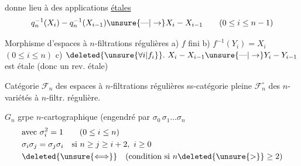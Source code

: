 donne lieu à des applications \uline{étales}
\[ q_n^{-1}(X_i)-q_n^{-1}(X_{i-1})\unsure{\text{---}|\to}X_i-X_{i-1}\qquad(0\leq i\leq n-1) \]

Morphisme d'espaces à $n$-filtrations régulières
a) $f$ fini
b) $f^{-1}(Y_i)=X_i$ \qquad $(0\leq i\leq n)$
c) $\deleted{\unsure{\forall i|f_i}}.\ X_i-X_{i-1}\unsure{\text{---}|\to}Y_i-Y_{i-1}$ est étale (donc un rev. étale)

Catégorie $\mathcal F_n$ des espaces à $n$-filtrations régulières ss-catégorie pleine  $\mathcal F_n^\circ$ des  $n$-variétés à $n$-filtr. régulière.

$G_n$ grpe $n$-cartographique (engendré par $\sigma_0\,\sigma_1\ldots\sigma_n$
\[ \begin{aligned}&\text{avec }\sigma_i^2=1\qquad(0\leq i\leq n)\\ &\sigma_i\sigma_j=\sigma_j\sigma_i\quad\text{si }n\geq j\geq i+2,\ i\geq0\\ &\deleted{\unsure{\Longleftrightarrow}}\quad\text{(condition si }n\deleted{\unsure{>}}\geq2) \end{aligned} \]

